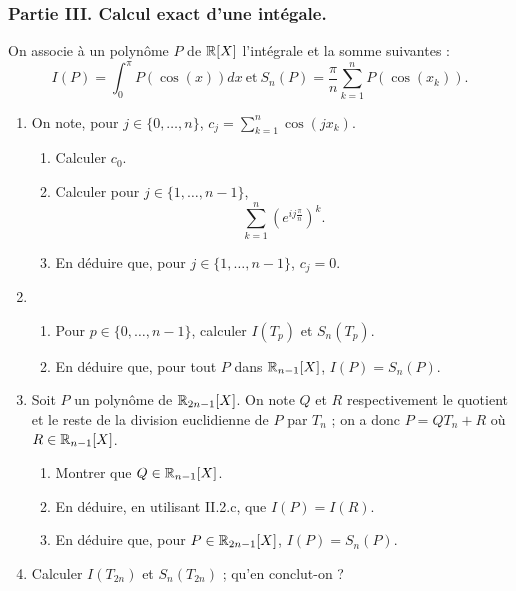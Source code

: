 \subsubsection*{Partie III. Calcul exact d'une intégale.}
On associe à un polynôme $P$ de $\mathbb{R}[X]$ l'intégrale et la somme
suivantes :
$$I(P)=\int_0^\pi P(\cos(x))dx\ \textrm{et}\
S_n(P)=\frac{\pi}{n}\sum_{k=1}^n P(\cos(x_k)).$$
\begin{enumerate}
  \item On note, pour $j\in\{0,\dots,n\}$,
  $c_j=\sum_{k=1}^n\cos(jx_k)$.
  \begin{enumerate}
    \item Calculer $c_0$.
    \item Calculer pour $j\in\{1,\dots,n-1\}$, $$\sum_{k=1}^n
    \left(e ^{ij\frac{\pi}n}\right)^k.$$
    \item En déduire que, pour $j\in\{1,\dots,n-1\}$, $c_j=0$.
  \end{enumerate}
  \item \begin{enumerate}
          \item Pour $p\in\{0,\dots,n-1\}$, calculer $I(T_p)$ et
          $S_n(T_p)$.
          \item En déduire que, pour tout $P$ dans $\mathbb{R}_{n-1}[X]$,
          $I(P)=S_n(P)$.
        \end{enumerate}
  \item Soit $P$ un polynôme de $\mathbb{R}_{2n-1}[X]$. On note $Q$ et $R$
  respectivement le quotient et le reste de la division euclidienne
  de $P$ par $T_n$ ; on a donc $P=QT_n+R$ où $R\in\mathbb{R}_{n-1}[X]$.
  \begin{enumerate}
    \item Montrer que $Q\in\mathbb{R}_{n-1}[X]$.
    \item En déduire, en utilisant II.2.c, que $I(P)=I(R)$.
    \item En déduire que, pour $P\in \mathbb{R}_{2n-1}[X]$, $I(P)=S_n(P)$.
  \end{enumerate}
  \item Calculer $I(T_{2n})$ et $S_n(T_{2n})$ ; qu'en conclut-on ?
\end{enumerate}